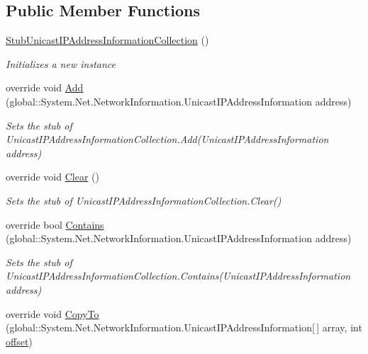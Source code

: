 \subsection*{Public Member Functions}
\begin{DoxyCompactItemize}
\item 
\hyperlink{class_system_1_1_net_1_1_network_information_1_1_fakes_1_1_stub_unicast_i_p_address_information_collection_a0c0e49bc92065a5fc92908cf4cb8b60f}{Stub\-Unicast\-I\-P\-Address\-Information\-Collection} ()
\begin{DoxyCompactList}\small\item\em Initializes a new instance\end{DoxyCompactList}\item 
override void \hyperlink{class_system_1_1_net_1_1_network_information_1_1_fakes_1_1_stub_unicast_i_p_address_information_collection_a447484e24466efc8e7a6a9a33001c868}{Add} (global\-::\-System.\-Net.\-Network\-Information.\-Unicast\-I\-P\-Address\-Information address)
\begin{DoxyCompactList}\small\item\em Sets the stub of Unicast\-I\-P\-Address\-Information\-Collection.\-Add(\-Unicast\-I\-P\-Address\-Information address)\end{DoxyCompactList}\item 
override void \hyperlink{class_system_1_1_net_1_1_network_information_1_1_fakes_1_1_stub_unicast_i_p_address_information_collection_a1b16d1968b09dd54aa92465eaf40ec08}{Clear} ()
\begin{DoxyCompactList}\small\item\em Sets the stub of Unicast\-I\-P\-Address\-Information\-Collection.\-Clear()\end{DoxyCompactList}\item 
override bool \hyperlink{class_system_1_1_net_1_1_network_information_1_1_fakes_1_1_stub_unicast_i_p_address_information_collection_abb09ebb8bf4d13615ef18b68d07ce871}{Contains} (global\-::\-System.\-Net.\-Network\-Information.\-Unicast\-I\-P\-Address\-Information address)
\begin{DoxyCompactList}\small\item\em Sets the stub of Unicast\-I\-P\-Address\-Information\-Collection.\-Contains(\-Unicast\-I\-P\-Address\-Information address)\end{DoxyCompactList}\item 
override void \hyperlink{class_system_1_1_net_1_1_network_information_1_1_fakes_1_1_stub_unicast_i_p_address_information_collection_aad07b323627e73427d39d5f5d7ee5691}{Copy\-To} (global\-::\-System.\-Net.\-Network\-Information.\-Unicast\-I\-P\-Address\-Information\mbox{[}$\,$\mbox{]} array, int \hyperlink{jquery-1_810_82_8js_a4a9f594d20d927164551fc7fa4751a2f}{offset})

\end{DoxyCompactItemize}
